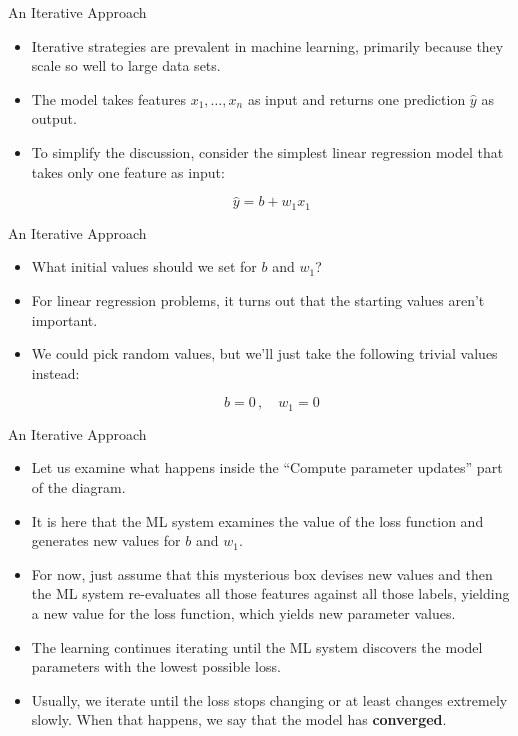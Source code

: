 \documentclass{beamer}
\begin{document}
\begin{frame}{An Iterative Approach}
\begin{itemize}    
\item Iterative strategies are prevalent in machine learning, primarily because they scale so well to large data sets.

\medskip
\item The model takes features $x_1,\ldots,x_n$ as input and returns one prediction $\hat{y}$ as output. 
    
\medskip
\item To simplify the discussion, consider the simplest linear regression model that takes only one feature as input:

$$ \hat{y} = b + w_1 x_1 $$

\end{itemize}
\end{frame}


\begin{frame}{An Iterative Approach}
\begin{itemize}
\item What initial values should we set for $b$ and $w_1$? 

\medskip 
\item For linear regression problems, it turns out that the starting values aren't important. 


\medskip
\item We could pick random values, but we'll just take the following trivial values instead:
    
$$ b = 0\,, \quad w_1 = 0 $$

\end{itemize}
\end{frame}


\begin{frame}{An Iterative Approach}
\begin{itemize}
\item Let us examine what happens inside the ``Compute parameter updates'' part of the diagram. 

\medskip
\item It is here that the ML system examines the value of the loss function and generates new values for $b$ and $w_1$. 

\medskip
\item For now, just assume that this mysterious box devises new values and then the ML system re-evaluates all those features against all those labels, yielding a new value for the loss function, which yields new parameter values. 

\medskip
\item The learning continues iterating until the ML system discovers the model parameters with the lowest possible loss. 

\medskip
\item Usually, we iterate until the loss stops changing or at least changes extremely slowly. When that happens, we say that the model has {\bf converged}.
\end{itemize}
\end{frame}
\end{document}
